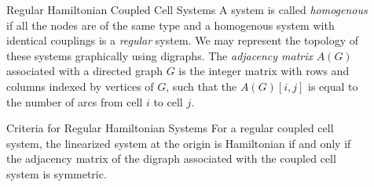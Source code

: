 \documentclass[final]{beamer}
\newlength{\sepwid}
\newlength{\onecolwid}
\begin{document}
\begin{frame}[t]
\begin{columns}[t]
\begin{column}{\onecolwid}
\begin{block}{Regular Hamiltonian Coupled Cell Systems}
        A system is called \emph{homogenous} if all the nodes are of the same type and a homogenous system with identical couplings is a \emph{regular} system. We may represent the topology of these systems graphically using digraphs. The \emph{adjacency matrix} $A(G)$ associated with a directed graph $G$ is the integer matrix with rows and columns indexed by vertices of $G$, such that the  $A(G)[i,j]$ is equal to the number of arcs from cell $i$ to cell $j$.%
\begin{alertblock}{Criteria for Regular Hamiltonian Systems}
For a regular coupled cell system, the linearized system at the origin is Hamiltonian if and only if the adjacency matrix of the digraph associated with the coupled cell system is symmetric. 
\end{alertblock}

        
        
        

\end{block}




            \end{column}
  \begin{column}{\sepwid}\end{column}			%
  
        \begin{column}{\onecolwid}
        

\end{column}
\end{columns}
\end{frame}
\end{document}
